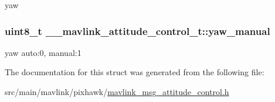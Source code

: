 yaw 

\hypertarget{struct____mavlink__attitude__control__t_aa80ff21e28326a25526d12f5f98bc81b}{
\subsubsection[{yaw\+\_\+manual}]{\setlength{\rightskip}{0pt plus 5cm}uint8\+\_\+t \+\_\+\+\_\+mavlink\+\_\+attitude\+\_\+control\+\_\+t\+::yaw\+\_\+manual}}\label{struct____mavlink__attitude__control__t_aa80ff21e28326a25526d12f5f98bc81b}


yaw auto\+:0, manual\+:1 



The documentation for this struct was generated from the following file\+:\begin{DoxyCompactItemize}
\item 
src/main/mavlink/pixhawk/\hyperlink{mavlink__msg__attitude__control_8h}{mavlink\+\_\+msg\+\_\+attitude\+\_\+control.\+h}\end{DoxyCompactItemize}
